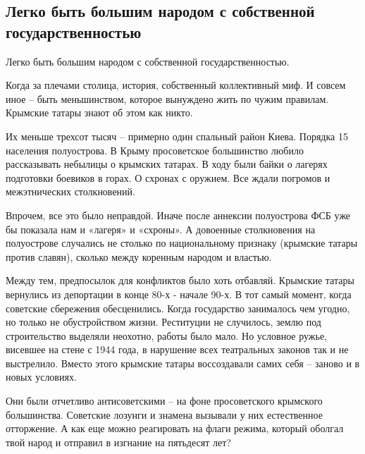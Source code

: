  
 
 
 
 

\subsection{Легко быть большим народом с собственной государственностью}

Легко быть большим народом с собственной государственностью. 

Когда за плечами столица, история, собственный коллективный миф. И совсем иное
– быть меньшинством, которое вынуждено жить по чужим правилам. Крымские татары
знают об этом как никто. 

Их меньше трехсот тысяч – примерно один спальный район Киева. Порядка 15%
населения полуострова. В Крыму просоветское большинство любило рассказывать
небылицы о крымских татарах. В ходу были байки о лагерях подготовки боевиков в
горах. О схронах с оружием. Все ждали погромов и межэтнических столкновений.

Впрочем, все это было неправдой. Иначе после аннексии полуострова ФСБ уже бы
показала нам и «лагеря» и «схроны». А довоенные столкновения на полуострове
случались не столько по национальному признаку (крымские татары против славян),
сколько между коренным народом и властью. 

Между тем, предпосылок для конфликтов было хоть отбавляй. Крымские татары
вернулись из депортации в конце 80-х - начале 90-х. В тот самый момент, когда
советские сбережения обесценились. Когда государство занималось чем угодно, но
только не обустройством жизни. Реституции не случилось, землю под строительство
выделяли неохотно, работы было мало. Но условное ружье, висевшее на стене с
1944 года, в нарушение всех театральных законов так и не выстрелило. Вместо
этого крымские татары воссоздавали самих себя – заново и в новых условиях. 

Они были отчетливо антисоветскими – на фоне просоветского крымского
большинства. Советские лозунги и знамена вызывали у них естественное
отторжение. А как еще можно реагировать на флаги режима, который оболгал твой
народ и отправил в изгнание на пятьдесят лет? 

